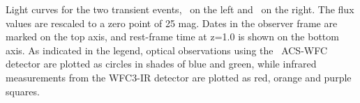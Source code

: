 \label{fig:LightCurves}
Light curves for the two transient events, \spockone\ on the left and \spocktwo\ on the right.  The flux values are rescaled to a zero point of 25 mag. Dates in the observer frame are marked on the top axis, and rest-frame time at z=1.0 is shown on the bottom axis.   As indicated in the legend, optical observations using the \HST\ ACS-WFC detector are plotted as circles in shades of blue and green, while infrared measurements from the WFC3-IR detector are plotted as red, orange and purple squares. 

  
